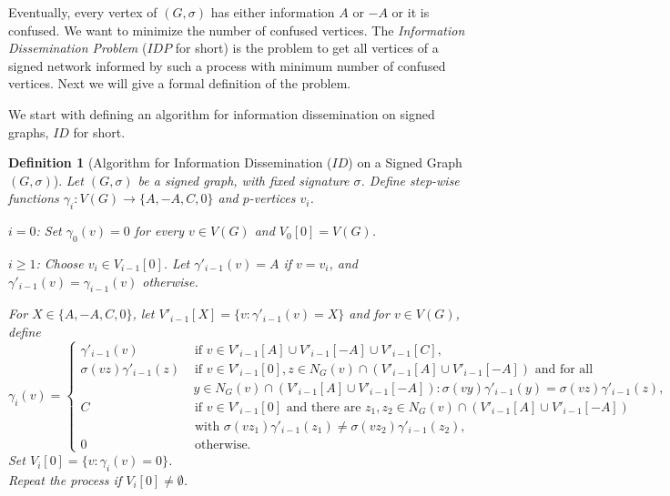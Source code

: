 \documentclass[a4paper,11pt]{article}
\newtheorem{defi}{Definition}[section]
\theoremstyle{remark}
\begin{document}
Eventually, every vertex of $(G,\sigma)$ has either information $A$  or $-A$ or it is confused. 
We want to minimize the number of confused vertices. 
The {\em Information Dissemination Problem} ($IDP$ for short) is the problem to get all vertices of
a signed network informed by such a process with minimum number of
confused vertices. Next we will give a formal definition of the problem. 

We start with defining an algorithm for information dissemination on signed graphs,
$ID$ for short. 

\begin{defi} [Algorithm for Information Dissemination ($ID$) on a Signed Graph $(G,\sigma)$]

Let $(G,\sigma)$ be a signed graph, with fixed signature $\sigma$. Define
step-wise functions 
$\gamma_i \colon V(G) \rightarrow \{A, -A, C, 0\}$ and $p$-vertices $v_i$.

$i=0$: Set $\gamma_0(v) = 0$ for every $v \in V(G)$ and $V_0[0] = V(G)$.

$i \geq 1$: Choose $v_i \in V_{i-1}[0]$. 
Let $\gamma'_{i-1}(v) =A$ if $v=v_{i}$, and $\gamma'_{i-1}(v) = \gamma_{i-1}(v)$ otherwise.

For $X \in \{A, -A, C, 0\}$, let $V'_{i-1}[X] = \{v \colon \gamma'_{i-1}(v) = X\}$ and for $v \in V(G)$, define \\[.2cm]

 $   \gamma_i(v) =  
 \begin{cases}
	\gamma'_{i-1}(v) & \text{ if } v \in V'_{i-1}[A] \cup V'_{i-1}[-A] \cup V'_{i-1}[C],\\
	\sigma(vz)\gamma'_{i-1}(z) & \text{ if } v \in V'_{i-1}[0], z \in N_G(v) \cap (V'_{i-1}[A] \cup V'_{i-1}[-A]) \text{ and for all} \\
	                                               & ~y \in N_G(v) \cap (V'_{i-1}[A] \cup V'_{i-1}[-A]): \sigma(vy) \gamma'_{i-1}(y) = \sigma(vz)\gamma'_{i-1}(z),\\
	C & \text{ if } v \in V'_{i-1}[0] \text{ and there are } z_1, z_2 \in N_G(v) \cap (V'_{i-1}[A] \cup V'_{i-1}[-A]) \\
	                                               & \text{ with }
	\sigma(vz_1) \gamma'_{i-1}(z_1) \not = \sigma(vz_2)\gamma'_{i-1}(z_2),\\
	0 & \text{ otherwise.}
\end{cases} $ \\

Set $V_i[0] = \{v \colon \gamma_i(v) = 0 \}$. \\[.2cm]
%
Repeat the process if $V_i[0] \not = \emptyset$.
\end{defi}
\end{document}
